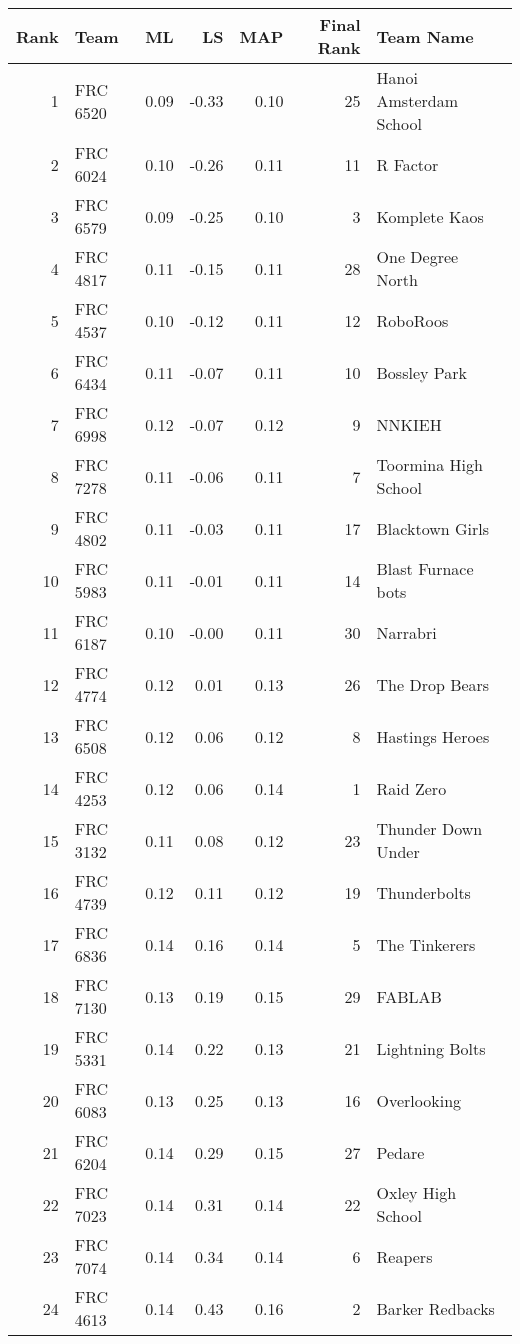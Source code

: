 \begin{center}
\begin{tabular}{ |r|l|r|r|r|r|l| }
\hline
Rank & Team & ML & LS & MAP & Final Rank & Team Name \\
\hline
  1 &  FRC 6520 & 0.09 & -0.33 & 0.10 & 25 & Hanoi Amsterdam School \\
  2 &  FRC 6024 & 0.10 & -0.26 & 0.11 & 11 & R Factor \\
  3 &  FRC 6579 & 0.09 & -0.25 & 0.10 & 3 & Komplete Kaos \\
  4 &  FRC 4817 & 0.11 & -0.15 & 0.11 & 28 & One Degree North \\
  5 &  FRC 4537 & 0.10 & -0.12 & 0.11 & 12 & RoboRoos \\
  6 &  FRC 6434 & 0.11 & -0.07 & 0.11 & 10 & Bossley Park \\
\hline
  7 &  FRC 6998 & 0.12 & -0.07 & 0.12 & 9 & NNKIEH \\
  8 &  FRC 7278 & 0.11 & -0.06 & 0.11 & 7 & Toormina High School \\
  9 &  FRC 4802 & 0.11 & -0.03 & 0.11 & 17 & Blacktown Girls \\
 10 &  FRC 5983 & 0.11 & -0.01 & 0.11 & 14 & Blast Furnace bots\\
 11 &  FRC 6187 & 0.10 & -0.00 & 0.11 & 30 & Narrabri \\
 12 &  FRC 4774 & 0.12 & 0.01 & 0.13  & 26 & The Drop Bears \\
\hline
 13 &  FRC 6508 & 0.12 & 0.06 & 0.12  & 8 & Hastings Heroes \\
 14 &  FRC 4253 & 0.12 & 0.06 & 0.14  & 1 & Raid Zero \\
 15 &  FRC 3132 & 0.11 & 0.08 & 0.12  & 23 & Thunder Down Under \\
 16 &  FRC 4739 & 0.12 & 0.11 & 0.12  & 19 & Thunderbolts \\
 17 &  FRC 6836 & 0.14 & 0.16 & 0.14  & 5 & The Tinkerers \\
 18 &  FRC 7130 & 0.13 & 0.19 & 0.15  & 29 & FABLAB \\
\hline
 19 &  FRC 5331 & 0.14 & 0.22 & 0.13  & 21 & Lightning Bolts \\
 20 &  FRC 6083 & 0.13 & 0.25 & 0.13  & 16 & Overlooking \\
 21 &  FRC 6204 & 0.14 & 0.29 & 0.15  & 27 & Pedare \\
 22 &  FRC 7023 & 0.14 & 0.31 & 0.14  & 22 & Oxley High School \\
 23 &  FRC 7074 & 0.14 & 0.34 & 0.14  & 6 & Reapers\\
 24 &  FRC 4613 & 0.14 & 0.43 & 0.16  & 2 & Barker Redbacks\\

\end{tabular}
\end{center}
